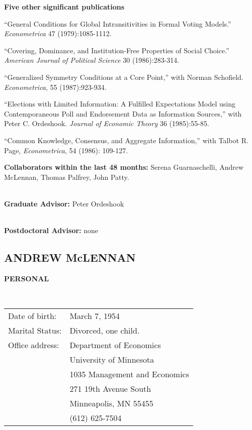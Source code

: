 \documentclass[12pt]{article}
\begin{document}
\noindent
{\bf Five other significant publications}
\begin{description}
\item
``General Conditions for Global Intransitivities in Formal Voting 
Models.''  {\em Econometrica} 47 (1979):1085-1112.
\item
``Covering, Dominance, and Institution-Free Properties of Social 
Choice.''  {\em American Journal of Political Science} 30 (1986):283-314.
\item
``Generalized Symmetry Conditions at a Core Point,'' with Norman 
Schofield.  {\em Econometrica}, 55 (1987):923-934.
\item
``Elections with Limited Information:  A Fulfilled Expectations Model 
using Contemporaneous Poll and Endorsement Data as Information 
Sources,'' with Peter C. Ordeshook.  {\em Journal of Economic Theory} 
36 (1985):55-85.
\item
``Common Knowledge, Consensus, and Aggregate Information,'' with
Talbot R. Page, {\it Econometrica}, 54 (1986): 109-127.

\end{description}



\noindent
{\bf Collaborators within the last 48 months:} Serena Guarnaschelli,
Andrew McLennan, Thomas Palfrey, John Patty.

\ \\
\noindent
{\bf Graduate Advisor:} Peter Ordeshook

\ \\
\noindent
{\bf Postdoctoral Advisor:} none

\newpage
\subsection{ANDREW McLENNAN}

\noindent
{\bf PERSONAL} 

\ \\
\begin{tabular}{ll}
Date of birth:&March 7, 1954\\
Marital Status:&Divorced, one child.\\
Office address:&Department of Economics \\
&University of Minnesota \\
&1035 Management and Economics \\
&271 19th Avenue South \\
&Minneapolis, MN 55455 \\
&(612) 625-7504 \\
\end{tabular}
\end{document}
